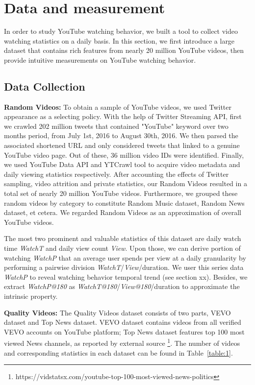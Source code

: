 
\section{Data and measurement}

In order to study YouTube watching behavior, we built a tool to collect video watching statistics on a daily basis. In this section, we first introduce a large dataset that contains rich features from nearly 20 million YouTube videos, then provide intuitive measurements on YouTube watching behavior.

\subsection{Data Collection}

\noindent\textbf{Random Videos:} To obtain a sample of YouTube videos, we used Twitter appearance as a selecting policy. With the help of Twitter Streaming API, first we crawled 202 million tweets that contained "YouTube" keyword over two months period, from July 1st, 2016 to August 30th, 2016. We then parsed the associated shortened URL and only considered tweets that linked to a genuine YouTube video page. Out of these, 36 million video IDs were identified. Finally, we used YouTube Data API and YTCrawl tool \cite{yu2015lifecyle} to acquire video metadata and daily viewing statistics respectively. After accounting the effects of Twitter sampling, video attrition and private statistics, our Random Videos resulted in a total set of nearly 20 million YouTube videos. Furthermore, we grouped these random videos by category to constitute Random Music dataset, Random News dataset, et cetera. We regarded Random Videos as an approximation of overall YouTube videos.

The most two prominent and valuable statistics of this dataset are daily watch time \textit{WatchT} and daily view count \textit{View}. Upon those, we can derive portion of watching \textit{WatchP} that an average user spends per view at a daily granularity by performing a pairwise division \textit{WatchT}/\textit{View}/duration. We user this series data \textit{WatchP} to reveal watching behavior temporal trend (see section xx). Besides, we extract \textit{WatchP@180} as \textit{WatchT@180}/\textit{View@180}/duration to approximate the intrinsic property.

\noindent\textbf{Quality Videos:} The Quality Videos dataset consists of two parts, VEVO dataset and Top News dataset. VEVO dataset contains videos from all verified VEVO accounts on YouTube platform; Top News dataset features top 100 most viewed News channels, as reported by external source \footnote{https://vidstatsx.com/youtube-top-100-most-viewed-news-politics}. The number of videos and corresponding statistics in each dataset can be found in Table~\ref{table:1}.

